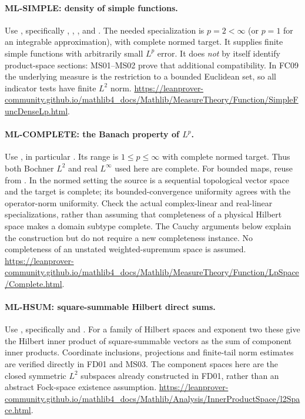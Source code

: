 \documentclass[11pt,a4paper]{article}
\theoremstyle{remark}\newtheorem{remark}[theorem]{Remark}
\begin{document}
\hypertarget{leaf:ML-SIMPLE}{}\paragraph{ML-SIMPLE: density of simple functions.}
Use , specifically
,
,
, and
.
The needed specialization is $p=2<\infty$ (or $p=1$ for an integrable approximation), with complete normed target. It supplies finite simple functions with arbitrarily small $L^p$ error. It does \emph{not} by itself identify product-space sections: MS01--MS02 prove that additional compatibility. In FC09 the underlying measure is the restriction to a bounded Euclidean set, so all indicator tests have finite $L^2$ norm.
\url{https://leanprover-community.github.io/mathlib4_docs/Mathlib/MeasureTheory/Function/SimpleFuncDenseLp.html}.

\hypertarget{leaf:ML-COMPLETE}{}\paragraph{ML-COMPLETE: the Banach property of $L^p$.}
Use , in particular
.
Its range is $1\leq p\leq\infty$ with complete normed target. Thus both Bochner $L^2$ and real $L^\infty$ used here are complete. For bounded maps, reuse  from . In the normed setting the source is a sequential topological vector space and the target is complete; its bounded-convergence uniformity agrees with the operator-norm uniformity. Check the actual complex-linear and real-linear specializations, rather than assuming that completeness of a physical Hilbert space makes a domain subtype complete. The Cauchy arguments below explain the construction but do not require a new completeness instance. No completeness of an unstated weighted-supremum space is assumed.
\url{https://leanprover-community.github.io/mathlib4_docs/Mathlib/MeasureTheory/Function/LpSpace/Complete.html}.

\hypertarget{leaf:ML-HSUM}{}\paragraph{ML-HSUM: square-summable Hilbert direct sums.}
Use , specifically
 and .
For a family of Hilbert spaces and exponent two these give the Hilbert inner product of square-summable vectors as the sum of component inner products. Coordinate inclusions, projections and finite-tail norm estimates are verified directly in FD01 and MS03. The component spaces here are the closed symmetric $L^2$ subspaces already constructed in FD01, rather than an abstract Fock-space existence assumption.
\url{https://leanprover-community.github.io/mathlib4_docs/Mathlib/Analysis/InnerProductSpace/l2Space.html}.
\end{document}
